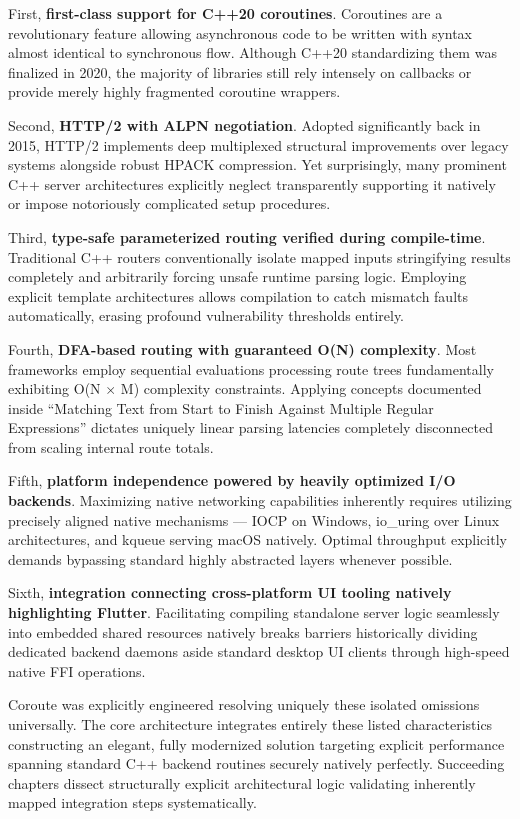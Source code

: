 First, \textbf{first-class support for C++20 coroutines}. Coroutines are a revolutionary feature allowing asynchronous code to be written with syntax almost identical to synchronous flow. Although C++20 standardizing them was finalized in 2020, the majority of libraries still rely intensely on callbacks or provide merely highly fragmented coroutine wrappers.

Second, \textbf{HTTP/2 with ALPN negotiation}. Adopted significantly back in 2015, HTTP/2 implements deep multiplexed structural improvements over legacy systems alongside robust HPACK compression. Yet surprisingly, many prominent C++ server architectures explicitly neglect transparently supporting it natively or impose notoriously complicated setup procedures.

Third, \textbf{type-safe parameterized routing verified during compile-time}. Traditional C++ routers conventionally isolate mapped inputs stringifying results completely and arbitrarily forcing unsafe runtime parsing logic. Employing explicit template architectures allows compilation to catch mismatch faults automatically, erasing profound vulnerability thresholds entirely.

Fourth, \textbf{DFA-based routing with guaranteed O(N) complexity}. Most frameworks employ sequential evaluations processing route trees fundamentally exhibiting O(N $\times$ M) complexity constraints. Applying concepts documented inside ``Matching Text from Start to Finish Against Multiple Regular Expressions'' \cite{stankov2024regex} dictates uniquely linear parsing latencies completely disconnected from scaling internal route totals.

Fifth, \textbf{platform independence powered by heavily optimized I/O backends}. Maximizing native networking capabilities inherently requires utilizing precisely aligned native mechanisms --- IOCP on Windows, io\_uring over Linux architectures, and kqueue serving macOS natively. Optimal throughput explicitly demands bypassing standard highly abstracted layers whenever possible.

Sixth, \textbf{integration connecting cross-platform UI tooling natively highlighting Flutter}. Facilitating compiling standalone server logic seamlessly into embedded shared resources natively breaks barriers historically dividing dedicated backend daemons aside standard desktop UI clients through high-speed native FFI operations.

Coroute was explicitly engineered resolving uniquely these isolated omissions universally. The core architecture integrates entirely these listed characteristics constructing an elegant, fully modernized solution targeting explicit performance spanning standard C++ backend routines securely natively perfectly. Succeeding chapters dissect structurally explicit architectural logic validating inherently mapped integration steps systematically.
